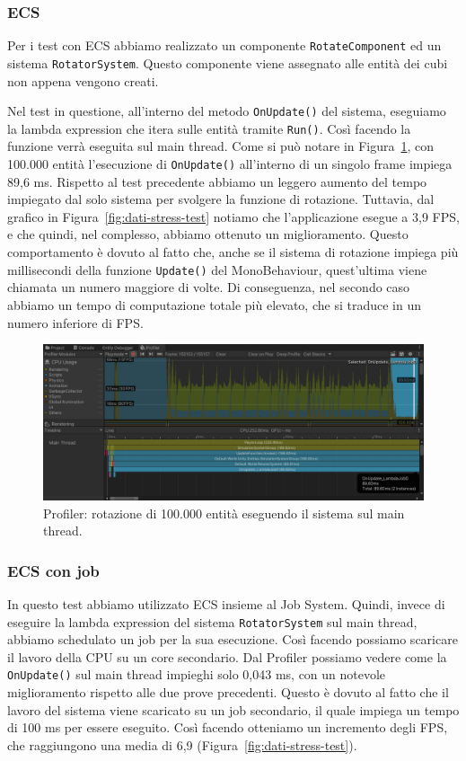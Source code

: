 \subsubsection{ECS}
Per i test con ECS abbiamo realizzato un componente \verb|RotateComponent| ed un sistema \verb|RotatorSystem|. Questo componente viene assegnato alle entità dei cubi non appena vengono creati.

Nel test in questione, all'interno del metodo \verb|OnUpdate()| del sistema, eseguiamo la lambda expression che itera sulle entità tramite \verb|Run()|. Così facendo la funzione verrà eseguita sul main thread. Come si può notare in Figura~\ref{fig:profiler-100k(2)}, con 100.000 entità l'esecuzione di \verb|OnUpdate()| all'interno di un singolo frame impiega 89,6 ms. Rispetto al test precedente abbiamo un leggero aumento del tempo impiegato dal solo sistema per svolgere la funzione di rotazione. Tuttavia, dal grafico in Figura~\ref{fig:dati-stress-test} notiamo che l'applicazione esegue a 3,9 FPS, e che quindi, nel complesso, abbiamo ottenuto un miglioramento. Questo comportamento è dovuto al fatto che, anche se il sistema di rotazione impiega più millisecondi della funzione \verb|Update()| del MonoBehaviour, quest'ultima viene chiamata un numero maggiore di volte. Di conseguenza, nel secondo caso abbiamo un tempo di computazione totale più elevato, che si traduce in un numero inferiore di FPS.

\begin{figure}[!ht]
    \centering
    \includegraphics[width=0.95\columnwidth]{gfx/imgs/chapter5/ProfilerStressTest100k(2).png}
    \caption{Profiler: rotazione di 100.000 entità eseguendo il sistema sul main thread.}
    \label{fig:profiler-100k(2)}
\end{figure}

\subsubsection{ECS con job}
In questo test abbiamo utilizzato ECS insieme al Job System. Quindi, invece di eseguire la lambda expression del sistema \verb|RotatorSystem| sul main thread, abbiamo schedulato un job per la sua esecuzione. Così facendo possiamo scaricare il lavoro della CPU su un core secondario.
Dal Profiler possiamo vedere come la \verb|OnUpdate()| sul main thread impieghi solo 0,043 ms, con un notevole miglioramento rispetto alle due prove precedenti. Questo è dovuto al fatto che il lavoro del sistema viene scaricato su un job secondario, il quale impiega un tempo di 100 ms per essere eseguito. Così facendo otteniamo un incremento degli FPS, che raggiungono una media di 6,9 (Figura~\ref{fig:dati-stress-test}). 

